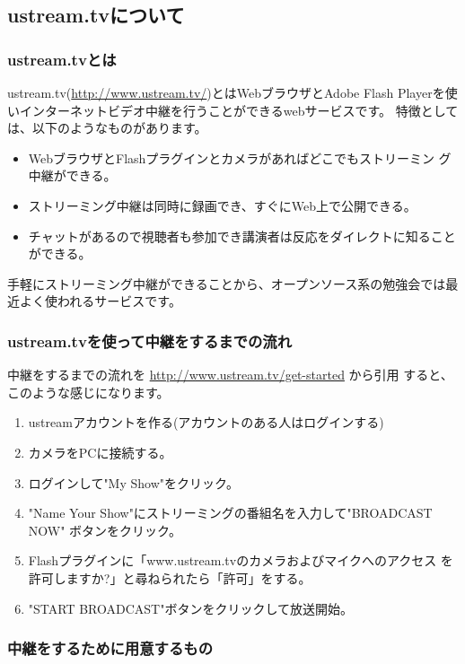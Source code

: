 \documentclass[mingoth,a4paper]{jsarticle}
\begin{document}
\subsection{ustream.tvについて}

\subsubsection{ustream.tvとは}

ustream.tv(\url{http://www.ustream.tv/})とはWebブラウザとAdobe Flash
Playerを使いインターネットビデオ中継を行うことができるwebサービスです。
特徴としては、以下のようなものがあります。

\begin{itemize}
 \item WebブラウザとFlashプラグインとカメラがあればどこでもストリーミン
       グ中継ができる。
 \item ストリーミング中継は同時に録画でき、すぐにWeb上で公開できる。
 \item チャットがあるので視聴者も参加でき講演者は反応をダイレクトに知ることができる。
\end{itemize}

手軽にストリーミング中継ができることから、オープンソース系の勉強会では最
近よく使われるサービスです。

\subsubsection{ustream.tvを使って中継をするまでの流れ}

中継をするまでの流れを \url{http://www.ustream.tv/get-started} から引用
すると、このような感じになります。

\begin{enumerate}
 \item ustreamアカウントを作る(アカウントのある人はログインする)
 \item カメラをPCに接続する。
 \item ログインして"My Show"をクリック。
 \item "Name Your Show"にストリーミングの番組名を入力して"BROADCAST NOW"
       ボタンをクリック。
 \item Flashプラグインに「www.ustream.tvのカメラおよびマイクへのアクセス
       を許可しますか?」と尋ねられたら「許可」をする。
 \item "START BROADCAST"ボタンをクリックして放送開始。
\end{enumerate}

\subsubsection{中継をするために用意するもの}
\end{document}
